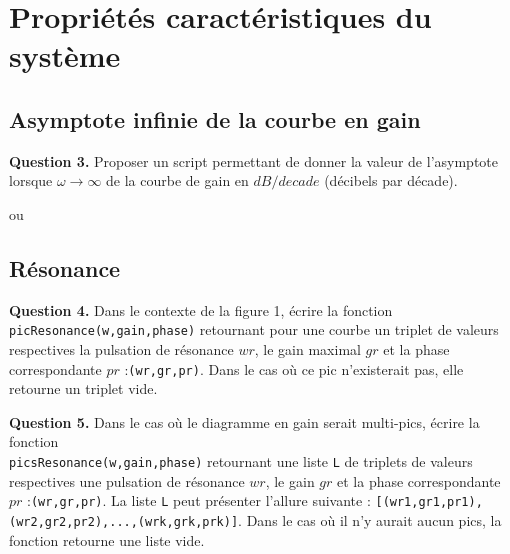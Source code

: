 \documentclass[11pt,fleqn]{book} %
\begin{document}
\section{Propriétés caractéristiques du système}

\subsection{Asymptote infinie de la courbe en gain}

\begin{tBox}
\textbf{Question 3.} Proposer un script permettant de donner la valeur de l'asymptote lorsque $\omega \to \infty$ de la courbe de gain en $dB/decade$ (décibels par décade).
\end{tBox}



ou 



\subsection{Résonance}

\begin{tBox}
\textbf{Question 4.} Dans le contexte de la figure 1, écrire la fonction \texttt{picResonance(w,gain,phase)} retournant pour une courbe un triplet de valeurs respectives la pulsation de résonance $wr$, le gain maximal $gr$ et la phase correspondante $pr$ :\texttt{(wr,gr,pr)}. Dans le cas où ce pic n'existerait pas, elle retourne un triplet vide.
\end{tBox}




\begin{tBox}
\textbf{Question 5.} Dans le cas où le diagramme en gain serait multi-pics, écrire la fonction \\ \texttt{picsResonance(w,gain,phase)} retournant une liste \texttt{L} de triplets de valeurs respectives une pulsation de résonance $wr$, le gain $gr$ et la phase correspondante $pr$ :\texttt{(wr,gr,pr)}. La liste \texttt{L} peut présenter l'allure suivante : \texttt{[(wr1,gr1,pr1),(wr2,gr2,pr2),...,(wrk,grk,prk)]}. Dans le cas où il n'y aurait aucun pics, la fonction retourne une liste vide.
\end{tBox}


\end{document}
